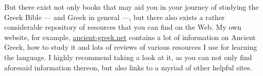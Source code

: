 But there exist not only books that may aid you in your journey of studying the Greek Bible — and Greek in general —, but there also exists a rather considerable repository of resources that you can find on the Web. My own website, for example, \url{ancient-greek.net} contains a lot of information on Ancient Greek, how to study it and lots of reviews of various resources I use for learning the language. I highly recommend taking a look at it, as you can not only find aforesaid information thereon, but also links to a myriad of other helpful sites. 
